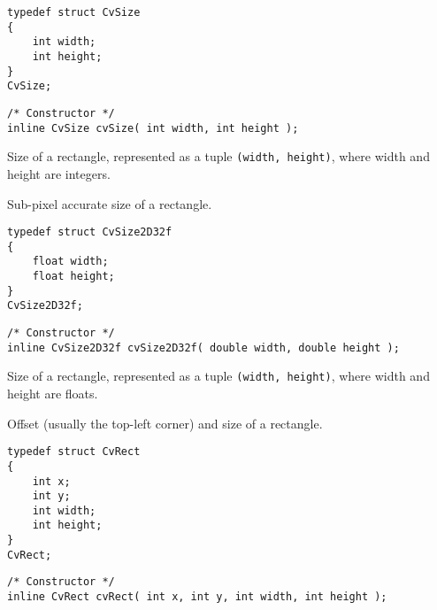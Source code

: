 \ifC %
\begin{lstlisting}
typedef struct CvSize
{
    int width; 
    int height; 
}
CvSize;
\end{lstlisting}

\begin{description}
\end{description}

\begin{lstlisting}
/* Constructor */
inline CvSize cvSize( int width, int height );
\end{lstlisting}
\else %
Size of a rectangle, represented as a tuple \texttt{(width, height)}, where width and height are integers.
\fi %

\label{CvSize2D32f}
Sub-pixel accurate size of a rectangle.

\ifC %
\begin{lstlisting}
typedef struct CvSize2D32f
{
    float width; 
    float height; 
}
CvSize2D32f;
\end{lstlisting}

\begin{description}
\end{description}

\begin{lstlisting}
/* Constructor */
inline CvSize2D32f cvSize2D32f( double width, double height );
\end{lstlisting}
\else %
Size of a rectangle, represented as a tuple \texttt{(width, height)}, where width and height are floats.
\fi %

\label{CvRect}
Offset (usually the top-left corner) and size of a rectangle.

\begin{lstlisting}
typedef struct CvRect
{
    int x; 
    int y; 
    int width; 
    int height; 
}
CvRect;
\end{lstlisting}

\begin{description}
\end{description}

\begin{lstlisting}
/* Constructor */
inline CvRect cvRect( int x, int y, int width, int height );
\end{lstlisting}

